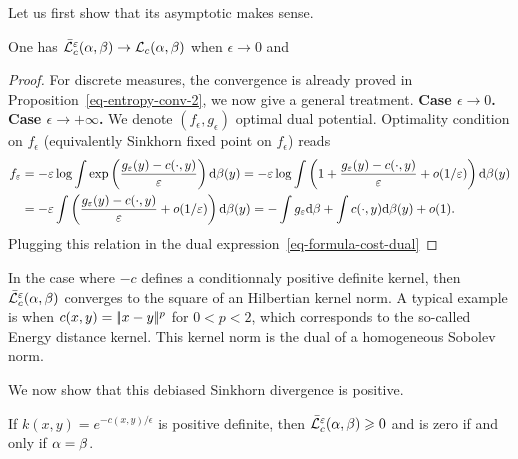 %
Let us first show that its asymptotic makes sense.

\begin{prop}
	One has $\bar{\mathcal{L}}_c^\varepsilon(\alpha,\beta) \rightarrow \mathcal{L}_c(\alpha,\beta)$ when $\epsilon\rightarrow 0$ and
\end{prop}
\begin{proof}For discrete measures, the convergence is already proved in Proposition~\eqref{eq-entropy-conv-2}, we now give a general treatment.
	\textbf{Case $\epsilon \rightarrow 0$.} 
	\textbf{Case $\epsilon \rightarrow +\infty$.} We denote $(f_\epsilon,g_\epsilon)$ optimal dual potential. Optimality condition on $f_\epsilon$ (equivalently Sinkhorn fixed point on $f_\epsilon$) reads
	\begin{align*}
		f_\varepsilon &= -\varepsilon \log \int \exp\left(  \frac{g_\varepsilon(y) - c(\cdot,y)}{\varepsilon}  \right) \mathrm{d} \beta(y)
		=	-\varepsilon \log \int \left(  1 + \frac{g_\varepsilon(y) - c(\cdot,y)}{\varepsilon} + o(1/\varepsilon)  \right) \mathrm{d} \beta(y) \\		
		&=	-\varepsilon \int \left(  \frac{g_\varepsilon(y) - c(\cdot,y)}{\varepsilon} + o(1/\varepsilon)  \right) \mathrm{d} \beta(y)
		= - \int g_\varepsilon \mathrm{d}\beta + \int c(\cdot,y) \mathrm{d} \beta(y) + o(1).  
	\end{align*}
	Plugging this relation in the dual expression~\eqref{eq-formula-cost-dual}
\end{proof}

In the case where $-c$ defines a conditionnaly positive definite kernel, then $\bar{\mathcal{L}}_c^\varepsilon(\alpha,\beta)$ converges to the square of an Hilbertian kernel norm. A typical example is when $c(x,y)=|\!| x-y |\!|^p$ for $0 < p < 2$, which corresponds to the so-called Energy distance kernel. This kernel norm is the dual of a homogeneous Sobolev norm.

We now show that this debiased Sinkhorn divergence is positive.

\begin{prop}
	If $k(x,y)=e^{-c(x,y)/\epsilon}$ is positive definite, then $\bar{\mathcal{L}}_c^\varepsilon(\alpha,\beta) \geqslant 0$ and is zero if and only if $\alpha=\beta$.
\end{prop}

